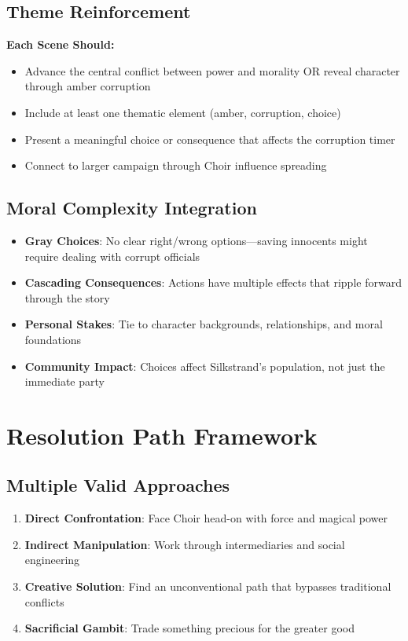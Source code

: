 \documentclass[11pt]{article}
\begin{document}
\subsection*{Theme Reinforcement}

\textbf{Each Scene Should:}
\begin{itemize}
  \item Advance the central conflict between power and morality OR reveal character through amber corruption
  \item Include at least one thematic element (amber, corruption, choice)
  \item Present a meaningful choice or consequence that affects the corruption timer
  \item Connect to larger campaign through Choir influence spreading
\end{itemize}

\subsection*{Moral Complexity Integration}

\begin{itemize}
  \item \textbf{Gray Choices}: No clear right/wrong options---saving innocents might require dealing with corrupt officials
  \item \textbf{Cascading Consequences}: Actions have multiple effects that ripple forward through the story
  \item \textbf{Personal Stakes}: Tie to character backgrounds, relationships, and moral foundations
  \item \textbf{Community Impact}: Choices affect Silkstrand's population, not just the immediate party
\end{itemize}

\section*{Resolution Path Framework}

\subsection*{Multiple Valid Approaches}

\begin{enumerate}
  \item \textbf{Direct Confrontation}: Face Choir head-on with force and magical power
  \item \textbf{Indirect Manipulation}: Work through intermediaries and social engineering
  \item \textbf{Creative Solution}: Find an unconventional path that bypasses traditional conflicts
  \item \textbf{Sacrificial Gambit}: Trade something precious for the greater good
\end{enumerate}
\end{document}
